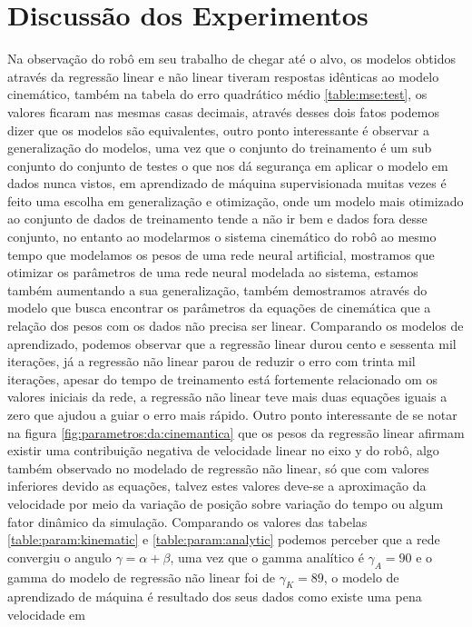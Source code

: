 \section{Discussão dos Experimentos}
Na observação do robô em seu trabalho de chegar até o alvo, os modelos
obtidos através da regressão linear e não linear tiveram respostas
idênticas ao modelo cinemático, também na tabela do erro quadrático médio \ref{table:mse:test},
os valores ficaram nas mesmas casas decimais, através desses dois fatos
podemos dizer que os modelos são equivalentes, outro ponto interessante é
observar a generalização do modelos, uma vez que o conjunto do treinamento
é um sub conjunto do conjunto de testes o que nos dá segurança em aplicar
o modelo em dados nunca vistos, em aprendizado de máquina supervisionada
muitas vezes é feito uma escolha em generalização e otimização, onde um
modelo mais otimizado ao conjunto de dados de treinamento tende a não ir
bem e dados fora desse conjunto, no entanto ao modelarmos o sistema cinemático
do robô ao mesmo tempo que modelamos os pesos de uma rede neural artificial,
mostramos que otimizar os parâmetros de uma rede neural modelada ao sistema,
estamos também aumentando a sua generalização, também demostramos através do
modelo que busca encontrar os parâmetros da equações de cinemática
que a relação dos pesos com os dados não precisa ser linear. Comparando
os modelos de aprendizado, podemos observar que a regressão linear durou
cento e sessenta mil iterações, já a regressão não linear parou de reduzir
o erro com trinta mil iterações, apesar do tempo de treinamento está
fortemente relacionado om os valores iniciais da rede, a regressão não
linear teve mais duas equações iguais a zero que ajudou a guiar o erro
mais rápido. Outro ponto interessante de se notar na figura \ref{fig:parametros:da:cinemantica}
que os pesos da regressão linear afirmam existir uma contribuição negativa
de velocidade linear no eixo y do robô, algo também observado no modelado de
regressão não linear, só que com valores inferiores devido as equações,
talvez estes valores deve-se a aproximação da velocidade por meio da variação
de posição sobre variação do tempo ou algum fator dinâmico da simulação.
Comparando os valores das tabelas \ref{table:param:kinematic} e \ref{table:param:analytic}
podemos perceber que a rede convergiu o angulo $\gamma = \alpha + \beta$,
uma vez que o gamma analítico é  $\gamma_{A} = 90$ e o gamma do modelo
de regressão não linear foi de $\gamma_{K} = 89$, o modelo de aprendizado
de máquina é resultado dos seus dados como existe uma pena velocidade em
